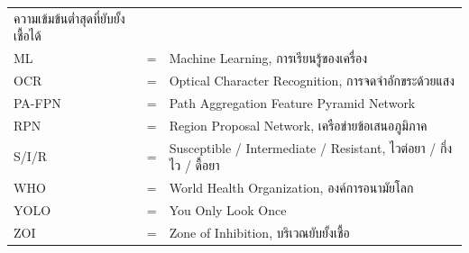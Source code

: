 \begin{tabular}{@{}lcp{10.5cm}@{}}
                  ความเข้มข้นต่ำสุดที่ยับยั้งเชื้อได้ \\[0.1cm]
  ML        & = & Machine Learning, การเรียนรู้ของเครื่อง \\[0.1cm]
  OCR       & = & Optical Character Recognition,
                  การจดจำอักขระด้วยแสง \\[0.1cm]
  PA-FPN    & = & Path Aggregation Feature Pyramid Network \\[0.1cm]
  RPN       & = & Region Proposal Network, เครือข่ายข้อเสนอภูมิภาค \\[0.1cm]
  S/I/R     & = & Susceptible / Intermediate / Resistant,
                  ไวต่อยา / กึ่งไว / ดื้อยา \\[0.1cm]
  WHO       & = & World Health Organization, องค์การอนามัยโลก \\[0.1cm]
  YOLO      & = & You Only Look Once \\[0.1cm]
  ZOI       & = & Zone of Inhibition, บริเวณยับยั้งเชื้อ \\
\end{tabular}
